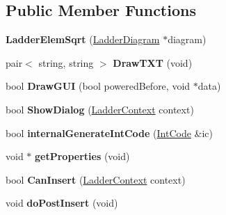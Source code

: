 \subsection*{Public Member Functions}
\begin{DoxyCompactItemize}
\item 
\hypertarget{class_ladder_elem_sqrt_a7c795e5b9cf1c464e9e55b4720c2bcb2}{{\bfseries Ladder\-Elem\-Sqrt} (\hyperlink{class_ladder_diagram}{Ladder\-Diagram} $\ast$diagram)}\label{class_ladder_elem_sqrt_a7c795e5b9cf1c464e9e55b4720c2bcb2}

\item 
\hypertarget{class_ladder_elem_sqrt_a0eda4fbdcecf6a1875b12eeb79635202}{pair$<$ string, string $>$ {\bfseries Draw\-T\-X\-T} (void)}\label{class_ladder_elem_sqrt_a0eda4fbdcecf6a1875b12eeb79635202}

\item 
\hypertarget{class_ladder_elem_sqrt_a1e56313b2646e910ba4995c91955a3ed}{bool {\bfseries Draw\-G\-U\-I} (bool powered\-Before, void $\ast$data)}\label{class_ladder_elem_sqrt_a1e56313b2646e910ba4995c91955a3ed}

\item 
\hypertarget{class_ladder_elem_sqrt_a1c3231cd0909b7692d24f03a464940ca}{bool {\bfseries Show\-Dialog} (\hyperlink{struct_ladder_context}{Ladder\-Context} context)}\label{class_ladder_elem_sqrt_a1c3231cd0909b7692d24f03a464940ca}

\item 
\hypertarget{class_ladder_elem_sqrt_ab2fe3efacbd9e98dd046274c651fc904}{bool {\bfseries internal\-Generate\-Int\-Code} (\hyperlink{class_int_code}{Int\-Code} \&ic)}\label{class_ladder_elem_sqrt_ab2fe3efacbd9e98dd046274c651fc904}

\item 
\hypertarget{class_ladder_elem_sqrt_acf371ab27c5ce11d8bdbd1eb37a978ea}{void $\ast$ {\bfseries get\-Properties} (void)}\label{class_ladder_elem_sqrt_acf371ab27c5ce11d8bdbd1eb37a978ea}

\item 
\hypertarget{class_ladder_elem_sqrt_a269de705285b3758bdffc7284dc5a711}{bool {\bfseries Can\-Insert} (\hyperlink{struct_ladder_context}{Ladder\-Context} context)}\label{class_ladder_elem_sqrt_a269de705285b3758bdffc7284dc5a711}

\item 
\hypertarget{class_ladder_elem_sqrt_ae62d76c185b77ff37188feb35ca880d6}{void {\bfseries do\-Post\-Insert} (void)}\label{class_ladder_elem_sqrt_ae62d76c185b77ff37188feb35ca880d6}


\end{DoxyCompactItemize}
